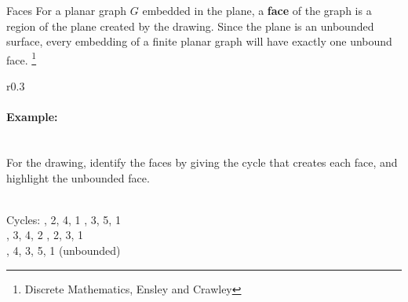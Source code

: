 \documentclass[a4paper,12pt]{book}
\begin{document}
    \begin{intro}{Faces}
        For a planar graph $G$ embedded in the plane,
        a \textbf{face} of the graph is a region of the plane created
        by the drawing. Since the plane is an unbounded surface, every
        embedding of a finite planar graph will have exactly one
        unbound face.
        \footnote{Discrete Mathematics, Ensley and Crawley}

        \begin{wrapfigure}{r}{0.3\textwidth}
            \begin{center}
            \end{center}
        \end{wrapfigure}
        
        \paragraph{Example:} ~\\
            For the drawing, identify the faces by giving the cycle that
            creates each face, and highlight the unbounded face.

        ~\\
        Cycles: , 2, 4, 1 , 3, 5, 1 \\ , 3, 4, 2 , 2, 3, 1 \\ , 4, 3, 5, 1 (unbounded)
    \end{intro}
\end{document}
